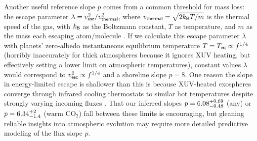 \documentclass[modern,linenumbers,trackchanges]{aastex7}
\begin{document}
Another useful reference slope $p$ comes from a common threshold for mass loss: the escape parameter $\lambda =  v_{\sf esc}^2/v_{\sf thermal}^2$, where $v_{\sf thermal} = \sqrt{2k_{\sf B} T/m}$  is the thermal speed of the gas, with $k_{\sf B}$ as the Boltzmann constant, $T$ as temperature, and $m$ as the mass each escaping atom/molecule \citep[see][]{schallerVolatileLossRetention2007, johnsonExospheresAtmosphericEscape2008, gronoffAtmosphericEscapeProcesses2020}. If we calculate this escape parameter $\lambda$ with planets' zero-albedo instantaneous equilibrium temperature $T = T_{\sf eq}  \propto f^{1/4}$ (horribly inaccurately for thick atmospheres because it ignores XUV heating, but effectively setting a lower limit on atmospheric temperatures), constant values $\lambda$ would correspond to $v_{\sf esc}^2 \propto f^{1/4}$ and a shoreline slope $p=8$. One reason the slope in energy-limited escape is  shallower than this is because XUV-heated exospheres converge through infrared cooling thermostats to similar hot temperatures despite strongly varying incoming fluxes \citep{chamberlainUpperAtmospheresPlanets1962, murray-clayAtmosphericEscapeHot2009, chatterjeeNovelPhysicsEscaping2024}. That our inferred slopes $p=6.08_{-0.48}^{+0.69}$ (any) or $p=6.34_{-1.4}^{+2}$ (warm CO$_2$) fall between these limits is encouraging, but gleaning reliable insights into atmospheric evolution may require more detailed predictive modeling of the flux slope $p$. 
\end{document}
